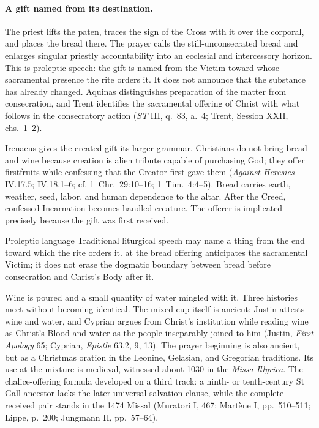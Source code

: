 \paragraph{A gift named from its destination.}

The priest lifts the paten, traces the sign of the Cross with it over the corporal, and places the bread there. The prayer calls the still-unconsecrated bread  and enlarges singular priestly accountability into an ecclesial and intercessory horizon. This is proleptic speech: the gift is named from the Victim toward whose sacramental presence the rite orders it. It does not announce that the substance has already changed. Aquinas distinguishes preparation of the matter from consecration, and Trent identifies the sacramental offering of Christ with what follows in the consecratory action (\emph{ST} III, q.~83, a.~4; Trent, Session XXII, chs.~1--2).

Irenaeus gives the created gift its larger grammar. Christians do not bring bread and wine because creation is alien tribute capable of purchasing God; they offer firstfruits while confessing that the Creator first gave them (\emph{Against Heresies} IV.17.5; IV.18.1--6; cf. 1~Chr.~29:10--16; 1~Tim.~4:4--5). Bread carries earth, weather, seed, labor, and human dependence to the altar. After the Creed, confessed Incarnation becomes handled creature. The offerer is implicated precisely because the gift was first received.

\begin{massbox}{Proleptic language}
Traditional liturgical speech may name a thing from the end toward which the rite orders it.  at the bread offering anticipates the sacramental Victim; it does not erase the dogmatic boundary between bread before consecration and Christ's Body after it.
\end{massbox}


Wine is poured and a small quantity of water mingled with it. Three histories meet without becoming identical. The mixed cup itself is ancient: Justin attests wine and water, and Cyprian argues from Christ's institution while reading wine as Christ's Blood and water as the people inseparably joined to him (Justin, \emph{First Apology} 65; Cyprian, \emph{Epistle} 63.2, 9, 13). The prayer beginning  is also ancient, but as a Christmas oration in the Leonine, Gelasian, and Gregorian traditions. Its use at the mixture is medieval, witnessed about 1030 in the \emph{Missa Illyrica}. The chalice-offering formula developed on a third track: a ninth- or tenth-century St Gall ancestor lacks the later universal-salvation clause, while the complete received pair stands in the 1474 Missal (Muratori I, 467; Mart\`ene I, pp.~510--511; Lippe, p.~200; Jungmann II, pp.~57--64).

